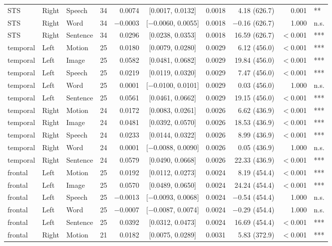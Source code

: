 \begin{table}[h]
\begin{tabular}{lllrrcrrrl}
STS & Right & Speech & 34 & 0.0074 & [0.0017, 0.0132] & 0.0018 & 4.18 (626.7) & 0.001 & ** \\
STS & Right & Word & 34 & $-$0.0003 & [$-$0.0060, 0.0055] & 0.0018 & $-$0.16 (626.7) & 1.000 & n.s. \\
STS & Right & Sentence & 34 & 0.0296 & [0.0238, 0.0353] & 0.0018 & 16.59 (626.7) & $<$0.001 & *** \\
temporal & Left & Motion & 25 & 0.0180 & [0.0079, 0.0280] & 0.0029 & 6.12 (456.0) & $<$0.001 & *** \\
temporal & Left & Image & 25 & 0.0582 & [0.0481, 0.0682] & 0.0029 & 19.84 (456.0) & $<$0.001 & *** \\
temporal & Left & Speech & 25 & 0.0219 & [0.0119, 0.0320] & 0.0029 & 7.47 (456.0) & $<$0.001 & *** \\
temporal & Left & Word & 25 & 0.0001 & [$-$0.0100, 0.0101] & 0.0029 & 0.03 (456.0) & 1.000 & n.s. \\
temporal & Left & Sentence & 25 & 0.0561 & [0.0461, 0.0662] & 0.0029 & 19.15 (456.0) & $<$0.001 & *** \\
temporal & Right & Motion & 24 & 0.0172 & [0.0083, 0.0261] & 0.0026 & 6.62 (436.9) & $<$0.001 & *** \\
temporal & Right & Image & 24 & 0.0481 & [0.0392, 0.0570] & 0.0026 & 18.53 (436.9) & $<$0.001 & *** \\
temporal & Right & Speech & 24 & 0.0233 & [0.0144, 0.0322] & 0.0026 & 8.99 (436.9) & $<$0.001 & *** \\
temporal & Right & Word & 24 & 0.0001 & [$-$0.0088, 0.0090] & 0.0026 & 0.05 (436.9) & 1.000 & n.s. \\
temporal & Right & Sentence & 24 & 0.0579 & [0.0490, 0.0668] & 0.0026 & 22.33 (436.9) & $<$0.001 & *** \\
frontal & Left & Motion & 25 & 0.0192 & [0.0112, 0.0273] & 0.0024 & 8.19 (454.4) & $<$0.001 & *** \\
frontal & Left & Image & 25 & 0.0570 & [0.0489, 0.0650] & 0.0024 & 24.24 (454.4) & $<$0.001 & *** \\
frontal & Left & Speech & 25 & $-$0.0013 & [$-$0.0093, 0.0068] & 0.0024 & $-$0.54 (454.4) & 1.000 & n.s. \\
frontal & Left & Word & 25 & $-$0.0007 & [$-$0.0087, 0.0074] & 0.0024 & $-$0.29 (454.4) & 1.000 & n.s. \\
frontal & Left & Sentence & 25 & 0.0392 & [0.0312, 0.0473] & 0.0024 & 16.69 (454.4) & $<$0.001 & *** \\
frontal & Right & Motion & 21 & 0.0182 & [0.0075, 0.0289] & 0.0031 & 5.83 (372.9) & $<$0.001 & *** \\

\end{tabular}
\end{table}
